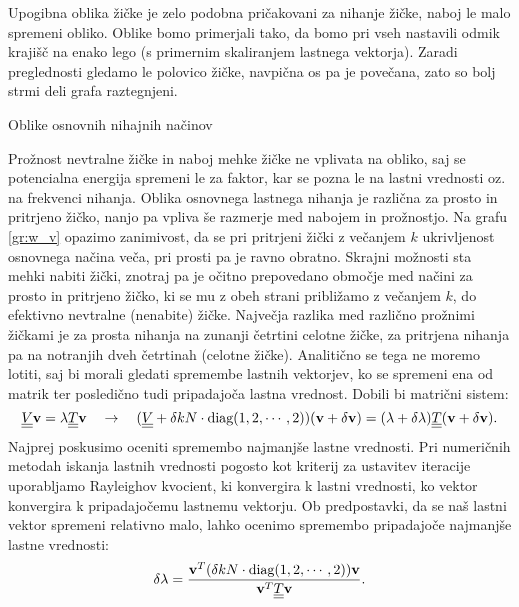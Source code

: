 \documentclass{article}
\begin{document}
Upogibna oblika žičke je zelo podobna pričakovani za nihanje žičke, naboj le malo spremeni obliko. Oblike bomo primerjali tako, da bomo pri vseh nastavili odmik krajišč na enako lego (s primernim skaliranjem lastnega vektorja). Zaradi preglednosti gledamo le polovico žičke, navpična os pa je povečana, zato so bolj strmi deli grafa raztegnjeni.
\begin{graph}[H]
    \centering
    
    \caption{Oblike osnovnih nihajnih načinov}
    \label{gr:w_v}
\end{graph}
Prožnost nevtralne žičke in naboj mehke žičke ne vplivata na obliko, saj se potencialna energija spremeni le za faktor, kar se pozna le na lastni vrednosti oz. na frekvenci nihanja. Oblika osnovnega lastnega nihanja je različna za prosto in pritrjeno žičko, nanjo pa vpliva še razmerje med nabojem in prožnostjo. Na grafu \ref{gr:w_v} opazimo zanimivost, da se pri pritrjeni žički z večanjem $k$ ukrivljenost osnovnega načina veča, pri prosti pa je ravno obratno. Skrajni možnosti sta mehki nabiti žički, znotraj pa je očitno prepovedano območje med načini za prosto in pritrjeno žičko, ki se mu z obeh strani približamo z večanjem $k$, do efektivno nevtralne (nenabite) žičke. Največja razlika med različno prožnimi žičkami je za prosta nihanja na zunanji četrtini celotne žičke, za pritrjena nihanja pa na notranjih dveh četrtinah (celotne žičke). Analitično se tega ne moremo lotiti, saj bi morali gledati spremembe lastnih vektorjev, ko se spremeni ena od matrik ter posledično tudi pripadajoča lastna vrednost. Dobili bi matrični sistem:
\begin{equation}
    \underline{\underline{V}}\mathbf{v}=\lambda\underline{\underline{T}}\mathbf{v}\quad\rightarrow\quad (\underline{\underline{V}}+\delta k N \cdot\text{diag}(1,2,\cdots, 2))(\mathbf{v}+\delta\mathbf{v})=(\lambda+\delta\lambda)\underline{\underline{T}}(\mathbf{v}+\delta\mathbf{v}).
    \label{eq:eig_chg}
\end{equation}
Najprej poskusimo oceniti spremembo najmanjše lastne vrednosti. Pri numeričnih metodah iskanja lastnih vrednosti pogosto kot kriterij za ustavitev iteracije uporabljamo Rayleighov kvocient, ki konvergira k lastni vrednosti, ko vektor konvergira k pripadajočemu lastnemu vektorju. Ob predpostavki, da se naš lastni vektor spremeni relativno malo, lahko ocenimo spremembo pripadajoče najmanjše lastne vrednosti:
\begin{equation}
    \delta\lambda=\frac{\mathbf{v}^T (\delta k N\cdot\text{diag}(1,2,\cdots,2))\mathbf{v}}{\mathbf{v}^T\underline{\underline{T}}\mathbf{v}}.
\end{equation}
\end{document}
